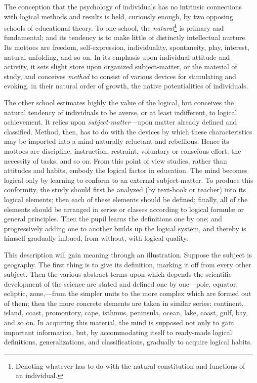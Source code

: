 \documentclass[letterpaper]{book}
\begin{document}

The conception that the psychology of individuals has no intrinsic
connections with logical methods and results is held, curiously enough,
by two opposing schools of educational theory. To one school, the
\emph{natural}\footnote{
Denoting whatever has to do with the natural constitution and functions
of an individual.
}
is primary and fundamental; and its tendency is to make little of
distinctly intellectual nurture. Its mottoes are freedom,
self-expression, individuality, spontaneity, play, interest, natural
unfolding, and so on. In its emphasis upon individual attitude and
activity, it sets slight store upon organized subject-matter, or the
material of study, and conceives \emph{method} to consist of various
devices for stimulating and evoking, in their natural order of growth,
the native potentialities of individuals.



The other school estimates highly the value of the logical, but
conceives the natural tendency of individuals to be averse, or at least
indifferent, to logical achievement. It relies upon
\emph{subject-matter}---upon matter already defined and classified.
Method, then, has to do with the devices by which these characteristics
may be imported into a mind naturally reluctant and
rebellious.
Hence its mottoes are discipline, instruction, restraint, voluntary or
conscious effort, the necessity of tasks, and so on. From this point of
view studies, rather than attitudes and habits, embody the logical
factor in education. The mind becomes logical only by learning to
conform to an external subject-matter. To produce this conformity, the
study should first be analyzed (by text-book or teacher) into its
logical elements; then each of these elements should be defined;
finally, all of the elements should be arranged in series or classes
according to logical formulæ or general principles. Then the pupil
learns the definitions one by one; and progressively adding one to
another builds up the logical system, and thereby is himself gradually
imbued, from without, with logical quality.


This description will gain meaning through an illustration. Suppose the
subject is geography. The first thing is to give its definition, marking
it off from every other subject. Then the various abstract terms upon
which depends the scientific development of the science are stated and
defined one by one---pole, equator, ecliptic, zone,---from the simpler
units to the more complex which are formed out of them; then the more
concrete elements are taken in similar series: continent, island, coast,
promontory, cape, isthmus, peninsula, ocean, lake, coast, gulf, bay, and
so on. In acquiring this material, the mind is supposed not only to gain
important information, but, by accommodating itself to ready-made
logical definitions, generalizations, and classifications, gradually to
acquire logical habits.
\end{document}
